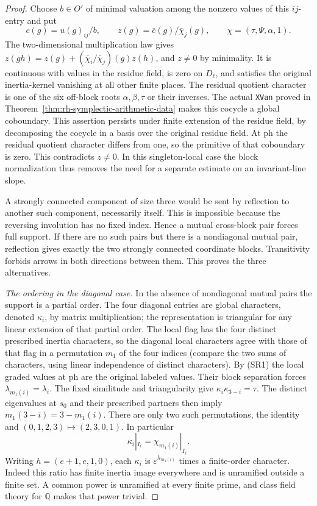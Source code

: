 \begin{proof}
Choose \(b\in O'\) of minimal valuation among the nonzero
values of this \(ij\)-entry and put
\[
 c(g)=u(g)_{ij}/b,\qquad
 z(g)=\bar c(g)/\bar\chi_j(g),
 \qquad \chi=(\tau,\Psi,\alpha,1).
\]
The two-dimensional multiplication law gives
\(z(gh)=z(g)+(\bar\chi_i/\bar\chi_j)(g)z(h)\),
and \(z\ne0\) by minimality. It is continuous with values
in the residue field, is zero on \(D_\ell\), and satisfies
the original inertia-kernel vanishing at all other finite
places. The residual quotient character is one of the
six off-block roots \(\alpha,\beta,\tau\) or their inverses.
The actual \texttt{XVan} proved in
Theorem~\ref{thm:rh-symplectic-arithmetic-data} makes this
cocycle a global coboundary. This assertion persists under
finite extension of the residue field, by decomposing the
cocycle in a basis over the original residue field.
At \(\mathrm{ph}\) the residual quotient character differs
from one, so the primitive of that coboundary is zero.
This contradicts \(z\ne0\). In this singleton-local case
the block normalization thus removes the need for a
separate estimate on an invariant-line slope.

A strongly connected component of size three would be
sent by reflection to another such component, necessarily
itself. This is impossible because the reversing involution
has no fixed index. Hence a mutual cross-block pair forces
full support. If there are no such pairs but there is
a nondiagonal mutual pair, reflection gives exactly the
two strongly connected coordinate blocks. Transitivity
forbids arrows in both directions between them. This
proves the three alternatives.

\emph{The ordering in the diagonal case.}
In the absence of nondiagonal mutual pairs the support is
a partial order. The four diagonal entries are global
characters, denoted \(\kappa_i\), by matrix multiplication;
the representation is triangular for any linear
extension of that partial order. The local flag has the
four distinct prescribed inertia characters, so the
diagonal local characters agree with those of that flag
in a permutation \(m_1\) of the four indices (compare
the two sums of characters, using linear independence
of distinct characters). By (SR1) the local graded
values at \(\mathrm{ph}\) are the original labeled
values. Their block separation forces
\(\lambda_{m_1(i)}=\lambda_i\).
The fixed similitude and triangularity give
\(\kappa_i\kappa_{3-i}=\tau\). The distinct eigenvalues
at \(s_0\) and their prescribed partners then imply
\(m_1(3-i)=3-m_1(i)\). There are only two such
permutations, the identity and \((0,1,2,3)\mapsto(2,3,0,1)\).
In particular
\[
         \kappa_i|_{I_\ell}=\chi_{m_1(i)}|_{I_\ell}.
\]
Writing \(h=(e+1,e,1,0)\), each \(\kappa_i\) is
\(\varepsilon^{h_{m_1(i)}}\) times a finite-order character.
Indeed this ratio has finite inertia image everywhere
and is unramified outside a finite set. A common power
is unramified at every finite prime, and class field
theory for \(\mathbb Q\) makes that power trivial.


\end{proof}

